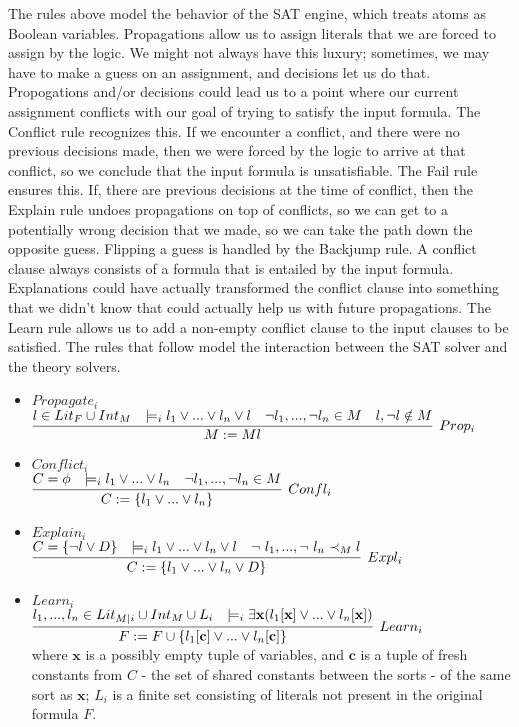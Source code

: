 \documentclass{article}
\begin{document}
The rules above model the behavior of the SAT engine, which treats atoms
as Boolean variables. Propagations allow us to assign 
literals that we are forced to assign by the logic. We 
might not always have this luxury; sometimes, we may have 
to make a guess on an assignment, and decisions let us do 
that. Propogations and/or decisions could lead us to 
a point where our current assignment conflicts with 
our goal of trying to satisfy the input formula. The 
Conflict rule recognizes this. If we encounter a conflict, 
and there were no previous decisions made, then we were 
forced by the logic to arrive at that conflict, so we 
conclude that the input formula is unsatisfiable. The Fail 
rule ensures this. If, there are previous decisions at
the time of conflict, then the Explain rule undoes 
propagations on top of conflicts, so we can get to a 
potentially wrong decision that we made, so we
can take the path down the opposite guess. Flipping a guess 
is handled by the Backjump rule. A conflict clause always 
consists of a formula that is entailed by the input formula. 
Explanations could have actually transformed the conflict 
clause into something that we didn't know that could actually
help us with future propagations. The Learn rule allows us 
to add a non-empty conflict clause to the input clauses to be 
satisfied. The rules that follow model the interaction between 
the SAT solver and the theory solvers.
\begin{itemize}
	\item $Propagate_i$ \\ $\infer[Prop_i]{M := Ml}	{l \in Lit_F \cup Int_M & 
		\models_i l_1 \lor ... \lor 
		l_n \lor l & \neg l_1, ..., \neg l_n \in M & l,\neg l \notin M}$ 
	\item $Conflict_i$ \\ $\infer[Confl_i]{C := \{l_1 \lor ... \lor l_n \}}
	{C = \phi & \models_i l_1 \lor ... \lor l_n & 
		\neg l_1, ..., \neg l_n \in M}$
	\item $Explain_i$ \\ $\infer[Expl_i]{C := \{l_1 \lor ... \lor l_n \lor D\}}
	{C = \{\neg l \lor D\} & \models_i l_1 \lor ... \lor l_n \lor l & 
		\neg\ l_1, ..., \neg\ l_n \prec_M l}$
	\item $Learn_i$ \\ $\infer[Learn_i]{F := F \cup \{l_1[\textbf{c}] 
		\lor ... \lor l_n[\textbf{c}]\}}
	{l_1,...,l_n \in Lit_{M|i} \cup Int_M \cup L_i & 
		\models_i \exists \textbf{x}(l_1[\textbf{x}] \lor ... 
		\lor l_n[\textbf{x}])}$ \\ where $\textbf{x}$ is a possibly empty 
	tuple of variables, and $\textbf{c}$ is a tuple of fresh constants 
	from $C$ - the set of shared constants between the sorts - of the
	same sort as $\textbf{x}$; $L_i$ is a finite set consisting of literals
	not present in the original formula $F$.
\end{itemize}
\end{document}
